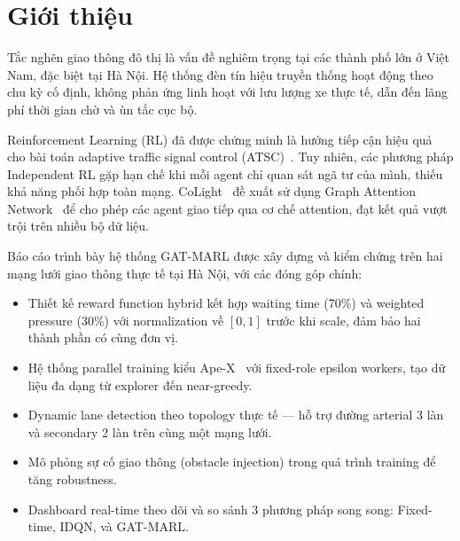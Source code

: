 \documentclass[conference]{IEEEtran}
\begin{document}
\section{Giới thiệu}

Tắc nghẽn giao thông đô thị là vấn đề nghiêm trọng tại các thành phố lớn ở Việt Nam, đặc biệt tại Hà Nội. Hệ thống đèn tín hiệu truyền thống hoạt động theo chu kỳ cố định, không phản ứng linh hoạt với lưu lượng xe thực tế, dẫn đến lãng phí thời gian chờ và ùn tắc cục bộ.

Reinforcement Learning (RL) đã được chứng minh là hướng tiếp cận hiệu quả cho bài toán adaptive traffic signal control (ATSC)~\cite{PressLight2019, CoLight2019, MPLight2020}. Tuy nhiên, các phương pháp Independent RL gặp hạn chế khi mỗi agent chỉ quan sát ngã tư của mình, thiếu khả năng phối hợp toàn mạng. CoLight~\cite{CoLight2019} đề xuất sử dụng Graph Attention Network~\cite{Velickovic2018} để cho phép các agent giao tiếp qua cơ chế attention, đạt kết quả vượt trội trên nhiều bộ dữ liệu.

Báo cáo trình bày hệ thống GAT-MARL được xây dựng và kiểm chứng trên hai mạng lưới giao thông thực tế tại Hà Nội, với các đóng góp chính:

\begin{itemize}[leftmargin=*]
    \item Thiết kế reward function hybrid kết hợp waiting time (70\%) và weighted pressure (30\%) với normalization về $[0, 1]$ trước khi scale, đảm bảo hai thành phần có cùng đơn vị.
    \item Hệ thống parallel training kiểu Ape-X~\cite{ApeX2018} với fixed-role epsilon workers, tạo dữ liệu đa dạng từ explorer đến near-greedy.
    \item Dynamic lane detection theo topology thực tế --- hỗ trợ đường arterial 3 làn và secondary 2 làn trên cùng một mạng lưới.
    \item Mô phỏng sự cố giao thông (obstacle injection) trong quá trình training để tăng robustness.
    \item Dashboard real-time theo dõi và so sánh 3 phương pháp song song: Fixed-time, IDQN, và GAT-MARL.
\end{itemize}

\end{document}
